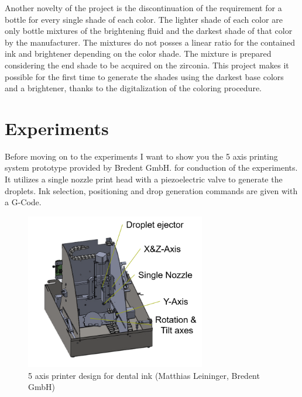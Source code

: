 Another novelty of the project is the discontinuation of the requirement for a bottle for every single shade of each color. The lighter shade of each color are only bottle mixtures of the brightening fluid and the darkest shade of that color by the manufacturer. The mixtures do not posses a linear ratio for the contained ink and brightener depending on the color shade. The mixture is prepared considering the end shade to be acquired on the zirconia. This project makes it possible for the first time to generate the shades using the darkest base colors and a brightener, thanks to the digitalization of the coloring procedure.

\chapter{Experiments}

Before moving on to the experiments I want to show you the 5 axis printing system prototype provided by Bredent GmbH. for conduction of the experiments. 
It utilizes a single nozzle print head with a piezoelectric valve to generate the droplets. Ink selection, positioning and drop generation commands are given with a G-Code.

\bigskip

\begin{figure}[H]
	\centering
	\includegraphics[width=0.7\textwidth]{grafiken/PrototypeText.png}
	\caption{5 axis printer design for dental ink (Matthias Leininger, Bredent GmbH)}
	\label{fig:Prototype}
\end{figure} 

\bigskip

